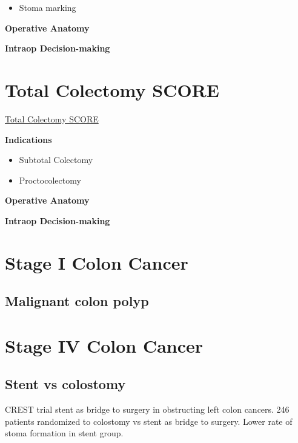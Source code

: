 \documentclass[
]{book}
\providecommand{\tightlist}{%
  \setlength{\itemsep}{0pt}\setlength{\parskip}{0pt}}
\begin{document}
\begin{itemize}
\tightlist
\item
  Stoma marking
\end{itemize}

\textbf{Operative Anatomy}

\textbf{Intraop Decision-making}

\hypertarget{TColectomyObj}{%
\chapter{Total Colectomy SCORE}\label{TColectomyObj}}

\href{https://www.surgicalcore.org/modulecontent.aspx?id=1000583}{Total Colectomy SCORE}

\textbf{Indications}

\begin{itemize}
\tightlist
\item
  Subtotal Colectomy
\item
  Proctocolectomy
\end{itemize}

\textbf{Operative Anatomy}

\textbf{Intraop Decision-making}

\hypertarget{stage-i-colon-cancer}{%
\chapter{Stage I Colon Cancer}\label{stage-i-colon-cancer}}

\hypertarget{malignant-colon-polyp}{%
\section{Malignant colon polyp}\label{malignant-colon-polyp}}

\hypertarget{stage-iv-colon-cancer}{%
\chapter{Stage IV Colon Cancer}\label{stage-iv-colon-cancer}}

\hypertarget{stent-vs-colostomy}{%
\section{Stent vs colostomy}\label{stent-vs-colostomy}}

CREST trial\citep{crestcollaborativegroup1073} stent as bridge to surgery in obstructing left colon cancers. 246 patients randomized to colostomy vs stent as bridge to surgery. Lower rate of stoma formation in stent group.
\end{document}
